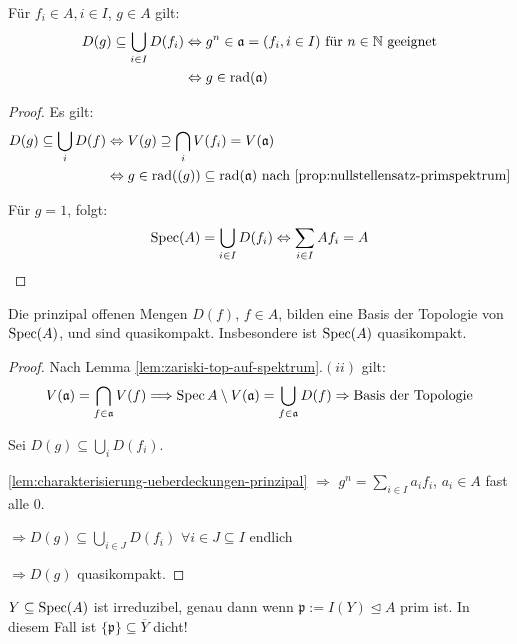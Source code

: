 \begin{lem}
\label{lem:charakterisierung-ueberdeckungen-prinzipal}
Für $f_{i} \in A, i\in I$, $g\in A$ gilt:
  \begin{align*}
    D(g)\subseteq\bigcup_{i\in I}D(f_{i})
    & \Leftrightarrow g^{n}\in\mathfrak{a}=(f_{i},i\in I)\text{ für }n \in \mathbb{N} \text{ geeignet}\\
    & \Leftrightarrow g\in\operatorname{rad}(\mathfrak{a})
  \end{align*}
\end{lem}
\begin{proof} Es gilt:
  \begin{align*}
    D(g)\subseteq\bigcup_{i}D(f)
    & \Leftrightarrow V(g)\supseteq\bigcap_{i} V(f_{i})=V(\mathfrak{a})\\
    & \Leftrightarrow g\in\operatorname{rad}((g))\subseteq\operatorname{rad}(\mathfrak{a}) \text{ nach } \ref{prop:nullstellensatz-primspektrum}
  \end{align*}

  Für $g=1$, folgt:
  \[ \operatorname{Spec}(A)=\bigcup_{i\in I}D(f_{i})\Leftrightarrow\sum_{i\in
      I}Af_{i}=A
  \]
\end{proof}
\begin{prop}
\label{prop:prinzipal-offene-bilden-basis}
Die prinzipal offenen Mengen $D(f)$, $f\in A$, bilden
  eine Basis der Topologie von $\operatorname{Spec}(A)$, und sind
  quasikompakt. Insbesondere ist $\operatorname{Spec}(A)$ quasikompakt.
\end{prop}
\begin{proof} Nach Lemma \ref{lem:zariski-top-auf-spektrum}$.(ii)$ gilt:
  \[
    V(\mathfrak{a})=\bigcap_{f \in\mathfrak{a}}V(f)\Longrightarrow\operatorname{Spec} A\setminus
    V(\mathfrak{a})=\bigcup_{f\in\mathfrak{a}}D(f)\Rightarrow\text{Basis
      der Topologie}
  \]

  Sei $D(g)\subseteq\bigcup_{i}D(f_{i})$.

  \ref{lem:charakterisierung-ueberdeckungen-prinzipal} $\Rightarrow$ $g^{n}=\sum_{i\in I}a_{i}f_{i}$, $a_{i}\in A$
  fast alle 0.

  $\Rightarrow D(g)\subseteq\bigcup_{i\in J}D(f_{i})$ $\forall i\in J\subseteq I$ endlich

  $\Rightarrow D(g)$ quasikompakt.
\end{proof}

\begin{prop}
\label{prop:charakterisierung-irreduzibel-spec}
  $Y\subseteq \operatorname{Spec}(A)$ ist irreduzibel, genau dann wenn
  $\mathfrak{p}:= I(Y)\unlhd A$ prim ist. In diesem Fall ist
  $\{\mathfrak{p}\}\subseteq\overline{Y}$ dicht!
\end{prop}

